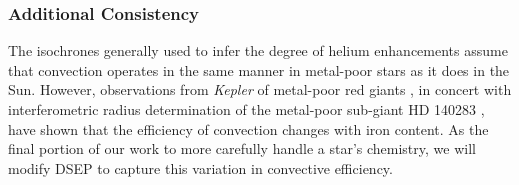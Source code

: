 \subsubsection{Additional Consistency}
The isochrones generally used to infer the degree of helium enhancements assume that
convection operates in the same manner in metal-poor stars as it does in the
Sun. However, observations from \textit{Kepler} of metal-poor red giants
\citep{Bonaca2012, tayar2017correlation}, in concert with interferometric
radius determination of the metal-poor sub-giant HD 140283
\citep{creevey2015benchmark}, have shown that the efficiency of convection
changes with iron content. As the final portion of our work to more carefully
handle a star's chemistry, we will modify DSEP to capture this variation in
convective efficiency. 
